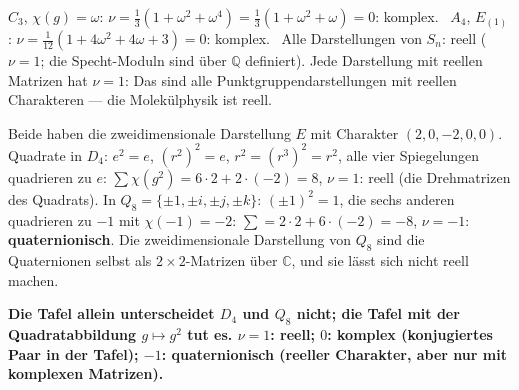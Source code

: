 \begin{merksatz}
$C_3$, $\chi(g) = \omega$: $\nu = \frac13(1 + \omega^{2} + \omega^{4}) = \frac13(1 + \omega^{2} + \omega) = 0$: komplex. \checkmark\ $A_4$, $E_{(1)}$: $\nu = \frac1{12}(1 + 4\omega^{2} + 4\omega + 3) = 0$: komplex. \checkmark\ Alle Darstellungen von $S_n$: reell ($\nu = 1$; die Specht-Moduln sind über $\mathbb Q$ definiert). Jede Darstellung mit reellen Matrizen hat $\nu = 1$: Das sind alle Punktgruppendarstellungen mit reellen Charakteren --- die Molekülphysik ist reell.

Beide haben die zweidimensionale Darstellung $E$ mit Charakter $(2, 0, -2, 0, 0)$. Quadrate in $D_4$: $e^{2} = e$, $(r^{2})^{2} = e$, $r^{2} = (r^{3})^{2} = r^{2}$, alle vier Spiegelungen quadrieren zu $e$: $\sum\chi(g^{2}) = 6\cdot2 + 2\cdot(-2) = 8$, $\nu = 1$: reell (die Drehmatrizen des Quadrats). In $Q_8 = \{\pm1, \pm i, \pm j, \pm k\}$: $(\pm1)^{2} = 1$, die sechs anderen quadrieren zu $-1$ mit $\chi(-1) = -2$: $\sum = 2\cdot2 + 6\cdot(-2) = -8$, $\nu = -1$: \textbf{quaternionisch}. Die zweidimensionale Darstellung von $Q_8$ sind die Quaternionen selbst als $2\times2$-Matrizen über $\mathbb C$, und sie lässt sich nicht reell machen.

\begin{center}
\begin{minipage}{0.9\textwidth}
\textbf{Die Tafel allein unterscheidet $D_4$ und $Q_8$ nicht; die Tafel mit der Quadratabbildung $g\mapsto g^{2}$ tut es. $\nu = 1$: reell; $0$: komplex (konjugiertes Paar in der Tafel); $-1$: quaternionisch (reeller Charakter, aber nur mit komplexen Matrizen).}
\end{minipage}
\end{center}

\begin{center}
\begin{minipage}{0.88\textwidth}
\end{minipage}
\end{center}
\end{merksatz}

